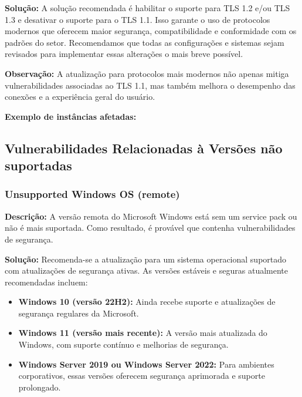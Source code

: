 \documentclass[a4paper,12pt]{article}
\begin{document}
\textbf{Solução:} A solução recomendada é habilitar o suporte para TLS 1.2 e/ou TLS 1.3 e desativar o suporte para o TLS 1.1. Isso garante o uso de protocolos modernos que oferecem maior segurança, compatibilidade e conformidade com os padrões do setor. Recomendamos que todas as configurações e sistemas sejam revisados para implementar essas alterações o mais breve possível.

\textbf{Observação:} A atualização para protocolos mais modernos não apenas mitiga vulnerabilidades associadas ao TLS 1.1, mas também melhora o desempenho das conexões e a experiência geral do usuário.



\textbf{Exemplo de instâncias afetadas:}
\begin{itemize}
\end{itemize}




\subsection{Vulnerabilidades Relacionadas à Versões não suportadas}
\subsubsection{Unsupported Windows OS (remote)}

\textbf{Descrição:}  
A versão remota do Microsoft Windows está sem um service pack ou não é mais suportada. Como resultado, é provável que contenha vulnerabilidades de segurança.

\textbf{Solução:}  
Recomenda-se a atualização para um sistema operacional suportado com atualizações de segurança ativas. As versões estáveis e seguras atualmente recomendadas incluem:

\begin{itemize}
  \item \textbf{Windows 10 (versão 22H2):}  
  Ainda recebe suporte e atualizações de segurança regulares da Microsoft.
  
  \item \textbf{Windows 11 (versão mais recente):}  
  A versão mais atualizada do Windows, com suporte contínuo e melhorias de segurança.
  
  \item \textbf{Windows Server 2019 ou Windows Server 2022:}  
  Para ambientes corporativos, essas versões oferecem segurança aprimorada e suporte prolongado.
\end{itemize}
\end{document}
